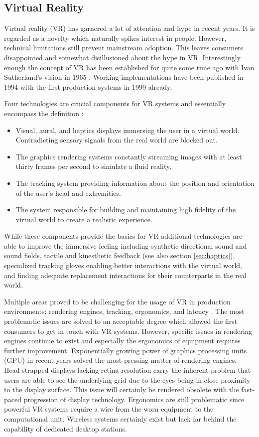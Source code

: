 \subsection{Virtual Reality} \label{sec:virtual-reality}
Virtual reality (VR) has garnered a lot of attention and hype in recent years.
It is regarded as a novelty which naturally spikes interest in people.
However, technical limitations still prevent mainstream adoption.
This leaves consumers disappointed and somewhat disillusioned about the hype in VR.
Interestingly enough the concept of VR has been established for quite some time ago with Ivan Sutherland's vision in 1965 \cite{Brooks1999}.
Working implementations have been published in 1994 with the first production systems in 1999 already.

Four technologies are crucial components for VR systems and essentially encompass the definition \cite{Brooks1999}:
\begin{itemize}
    \item Visual, aural, and haptics displays immersing the user in a virtual world. Contradicting sensory signals from the real world are blocked out.
    \item The graphics rendering systems constantly streaming images with at least thirty frames per second to simulate a fluid reality.
    \item The tracking system providing information about the position and orientation of the user's head and extremities.
    \item The system responsible for building and maintaining high fidelity of the virtual world to create a realistic experience.
\end{itemize}
While these components provide the basics for VR additional technologies are able to improve the immersive feeling including synthetic directional sound and sound fields, tactile and kinesthetic feedback (see also section \ref{sec:haptics}), specialized tracking gloves enabling better interactions with the virtual world, and finding adequate replacement interactions for their counterparts in the real world.

Multiple areas proved to be challenging for the usage of VR in production environments: rendering engines, tracking, ergonomics, and latency \cite{Brooks1999}.
The most problematic issues are solved to an acceptable degree which allowed the first consumers to get in touch with VR systems.
However, specific issues in rendering engines continue to exist and especially the ergonomics of equipment requires further improvement.
Exponentially growing power of graphics processing units (GPU) in recent years solved the most pressing matter of rendering engines.
Head-strapped displays lacking retina resolution carry the inherent problem that users are able to see the underlying grid due to the eyes being in close proximity to the display surface.
This issue will certainly be rendered obsolete with the fast-paced progression of display technology.
Ergonomics are still problematic since powerful VR systems require a wire from the worn equipment to the computational unit.
Wireless systems certainly exist but lack far behind the capability of dedicated desktop stations.
